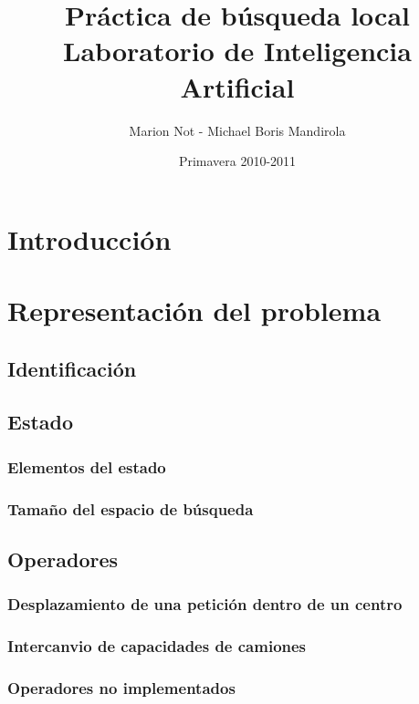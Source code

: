 \documentclass{article}
\title{\Huge{Práctica de búsqueda local} \\
\vspace{15mm}
   \Large{Laboratorio de Inteligencia Artificial}}
\author{Marion Not - Michael Boris Mandirola}
\date{Primavera 2010-2011}
\begin{document}
\maketitle
\newpage
\tableofcontents
\newpage
\section*{Introducción}


\section{Representación del problema}


\subsection{Identificación}


\subsection{Estado}
\subsubsection{Elementos del estado}
\subsubsection{Tamaño del espacio de búsqueda}


\subsection{Operadores}
\subsubsection{Desplazamiento de una petición dentro de un centro}
\subsubsection{Intercanvio de capacidades de camiones}
\subsubsection{Operadores no implementados}
\end{document}
